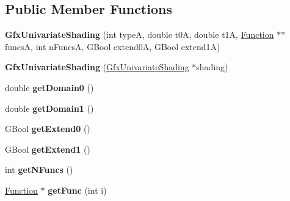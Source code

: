 \subsection*{Public Member Functions}
\begin{DoxyCompactItemize}
\item 
\mbox{\label{class_gfx_univariate_shading_aff5c486711479e8229d406427f378a7a}} 
{\bfseries Gfx\+Univariate\+Shading} (int typeA, double t0A, double t1A, \hyperlink{class_function}{Function} $\ast$$\ast$funcsA, int n\+FuncsA, G\+Bool extend0A, G\+Bool extend1A)
\item 
\mbox{\label{class_gfx_univariate_shading_acc11d3ab98509e2104ff84a765620341}} 
{\bfseries Gfx\+Univariate\+Shading} (\hyperlink{class_gfx_univariate_shading}{Gfx\+Univariate\+Shading} $\ast$shading)
\item 
\mbox{\label{class_gfx_univariate_shading_a97e6d03056aaa7f733f7c42d73d33a4b}} 
double {\bfseries get\+Domain0} ()
\item 
\mbox{\label{class_gfx_univariate_shading_a71e6694a78989c8bc87f54a1aea18a08}} 
double {\bfseries get\+Domain1} ()
\item 
\mbox{\label{class_gfx_univariate_shading_a4613efddba82c78de7871a74b62c3697}} 
G\+Bool {\bfseries get\+Extend0} ()
\item 
\mbox{\label{class_gfx_univariate_shading_abe551e277b77ded3733918fc8d1b44e7}} 
G\+Bool {\bfseries get\+Extend1} ()
\item 
\mbox{\label{class_gfx_univariate_shading_ae40833dc35996907713bb997dbc729d5}} 
int {\bfseries get\+N\+Funcs} ()
\item 
\mbox{\label{class_gfx_univariate_shading_a4d95b4c6b21bd866672c7d8c0db933a4}} 
\hyperlink{class_function}{Function} $\ast$ {\bfseries get\+Func} (int i)
\item 
\mbox{\label{class_gfx_univariate_shading_a3f11e21bba82a8f955b318df258f83c4}} 
$$
\end{DoxyCompactItemize}
